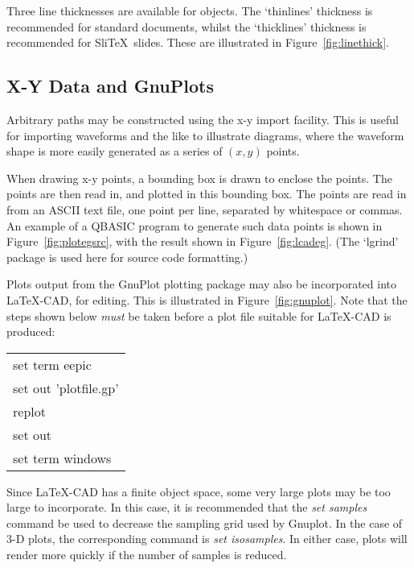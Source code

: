 \documentclass[a4paper]{article}
\begin{document}
Three line thicknesses are available for objects. The `thinlines'
thickness is recommended for standard documents, whilst the `thicklines'
thickness is recommended for Sli\TeX\ slides. These are illustrated in
Figure~\ref{fig:linethick}.



\subsection{ X-Y Data and GnuPlots }
\label{sec:xygnu}
Arbitrary paths may be constructed using the x-y import facility.
This is useful for importing waveforms and the like to illustrate
diagrams, where the waveform shape is more easily generated as
a series of $(x,y)$ points.

When drawing x-y points, a bounding box is drawn to enclose the
points. The points are then read in, and plotted in this bounding
box. The points are read in from an ASCII text file, one point
per line, separated by whitespace or commas. An example of a
QBASIC program to generate such data points is shown in
Figure~\ref{fig:plotegsrc}, with the result shown in Figure~\ref{fig:lcadeg}.
(The `lgrind' package is used here for source code formatting.)


Plots output from the GnuPlot plotting package may also be
incorporated into LaTeX-CAD, for editing. This is illustrated in
Figure~\ref{fig:gnuplot}. Note that the steps shown below
\textit{must} be taken before a plot file suitable for LaTeX-CAD is
produced:
\begin{center}
\begin{tabular}{l}
    set term eepic  \\
    set out 'plotfile.gp'  \\
    replot  \\
    set out \\
    set term windows \\
\end{tabular}
\end{center}

Since LaTeX-CAD has a finite object space, some very large plots
may be too large to incorporate. In this case, it is recommended
that the \textit{set samples} command be used to decrease the sampling
grid used by Gnuplot. In the case of 3-D plots, the corresponding
command is \textit{set isosamples}. In either case, plots will render
more quickly if the number of samples is reduced.
\end{document}
